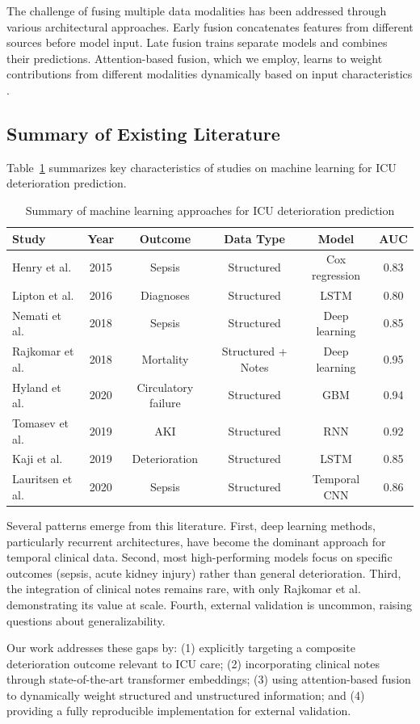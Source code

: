 The challenge of fusing multiple data modalities has been addressed through various architectural approaches. Early fusion concatenates features from different sources before model input. Late fusion trains separate models and combines their predictions. Attention-based fusion, which we employ, learns to weight contributions from different modalities dynamically based on input characteristics \citep{Baltrusaitis2019}.

\subsection{Summary of Existing Literature}

Table~\ref{tab:literature_summary} summarizes key characteristics of studies on machine learning for ICU deterioration prediction.

\begin{table}[H]
\centering
\caption{Summary of machine learning approaches for ICU deterioration prediction}
\label{tab:literature_summary}
\begin{tabular}{lccccc}
\toprule
\textbf{Study} & \textbf{Year} & \textbf{Outcome} & \textbf{Data Type} & \textbf{Model} & \textbf{AUC} \\
\midrule
Henry et al. & 2015 & Sepsis & Structured & Cox regression & 0.83 \\
Lipton et al. & 2016 & Diagnoses & Structured & LSTM & 0.80 \\
Nemati et al. & 2018 & Sepsis & Structured & Deep learning & 0.85 \\
Rajkomar et al. & 2018 & Mortality & Structured + Notes & Deep learning & 0.95 \\
Hyland et al. & 2020 & Circulatory failure & Structured & GBM & 0.94 \\
Tomasev et al. & 2019 & AKI & Structured & RNN & 0.92 \\
Kaji et al. & 2019 & Deterioration & Structured & LSTM & 0.85 \\
Lauritsen et al. & 2020 & Sepsis & Structured & Temporal CNN & 0.86 \\
\bottomrule
\end{tabular}
\end{table}

Several patterns emerge from this literature. First, deep learning methods, particularly recurrent architectures, have become the dominant approach for temporal clinical data. Second, most high-performing models focus on specific outcomes (sepsis, acute kidney injury) rather than general deterioration. Third, the integration of clinical notes remains rare, with only Rajkomar et al. demonstrating its value at scale. Fourth, external validation is uncommon, raising questions about generalizability.

Our work addresses these gaps by: (1) explicitly targeting a composite deterioration outcome relevant to ICU care; (2) incorporating clinical notes through state-of-the-art transformer embeddings; (3) using attention-based fusion to dynamically weight structured and unstructured information; and (4) providing a fully reproducible implementation for external validation.

